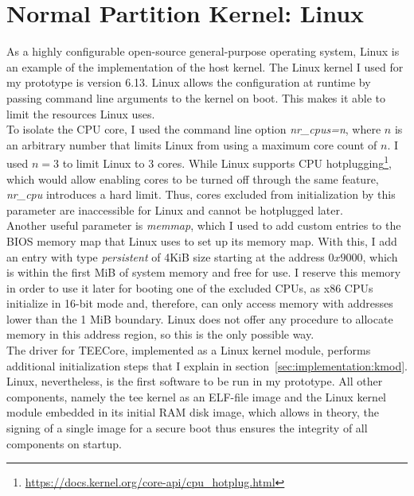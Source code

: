 \section{Normal Partition Kernel: Linux}
\label{sec:implementation:hostKernel}

As a highly configurable open-source general-purpose operating system, Linux is
an example of the implementation of the host kernel. The Linux kernel I used for
my prototype is version 6.13. Linux allows the configuration at runtime by
passing command line arguments to the kernel on boot. This makes it able to
limit the resources Linux uses. \\

To isolate the CPU core, I used the command line option \textit{nr\_cpus=n},
where $n$ is an arbitrary number that limits Linux from using a maximum core
count of $n$. I used $n=3$ to limit Linux to 3 cores. While Linux supports CPU
hotplugging\footnote{\url{https://docs.kernel.org/core-api/cpu_hotplug.html}},
which would allow enabling cores to be turned off through the same feature,
\textit{nr\_cpu} introduces a hard limit. Thus, cores excluded from
initialization by this parameter are inaccessible for Linux and cannot be
hotplugged later. \\

Another useful parameter is \textit{memmap}, which I used to add custom entries
to the BIOS memory map that Linux uses to set up its memory map. With this, I
add an entry with type \textit{persistent} of 4KiB size starting at the
address $0x9000$, which is within the first MiB of system memory and free for
use. I reserve this memory in order to use it later for booting one of the
excluded CPUs, as x86 CPUs initialize in 16-bit mode and, therefore, can only
access memory with addresses lower than the 1 MiB boundary. Linux does not offer
any procedure to allocate memory in this address region, so this is the only
possible way. \\

The driver for TEECore, implemented as a Linux kernel module, performs
additional initialization steps that I explain in
section~\ref{sec:implementation:kmod}. Linux, nevertheless, is the first
software to be run in my prototype. All other components, namely the \gls{tee}
kernel as an ELF-file image and the Linux kernel module embedded in its initial
RAM disk image, which allows in theory, the signing of a single image for a
secure boot thus ensures the integrity of all components on startup.\\

